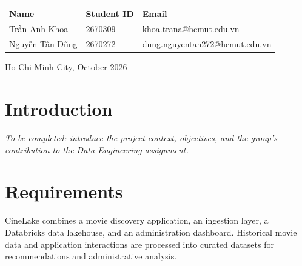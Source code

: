 \documentclass[a4paper,12pt]{article}
\newcommand{\reportdate}{October 2026}
\begin{document}
\begin{titlepage}
  {\small
    \renewcommand{\arraystretch}{1.3}

    \begin{tabularx}{\textwidth}{
      @{}L{3.6cm}C{1.7cm}
      >{\RaggedRight\arraybackslash}X@{}
    }
      \hline
      \textbf{Name}
      & \textbf{Student ID}
      & \textbf{Email}\\
      \hline
      Trần Anh Khoa
      & 2670309
      & khoa.trana@hcmut.edu.vn\\
      \hline
      Nguyễn Tấn Dũng
      & 2670272
      & dung.nguyentan272@hcmut.edu.vn\\
      \hline
    \end{tabularx}
  }

  \vfill
  {\large Ho Chi Minh City, \reportdate\par}
\end{titlepage}


\hypersetup{pageanchor=true}

\begingroup
  \small
  \tableofcontents
\endgroup

\clearpage
{}


\section{Introduction}
\label{sec:introduction}

\textit{To be completed: introduce the project context, objectives,
and the group's contribution to the Data Engineering assignment.}


\clearpage
\section{Requirements}
\label{sec:requirements}

CineLake combines a movie discovery application, an ingestion layer,
a Databricks data lakehouse, and an administration dashboard.
Historical movie data and application interactions are processed
into curated datasets for recommendations and administrative analysis.
\end{document}
